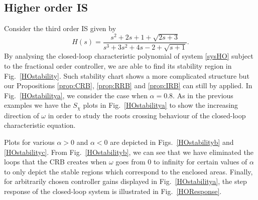 \documentclass[twoside,reqno,11pt]{fcaa-var} %
\begin{document}
\subsection{Higher order IS}
Consider the third order IS given by
\begin{equation}
H(s)=\frac{s^2+2s+1+\sqrt{2s+3}}{s^3+3s^2+4s-2+\sqrt{s+1}}. \label{sysHO}
\end{equation}
By analysing the closed-loop characteristic polynomial of system \eqref{sysHO} subject to the fractional order controller, we are able to find its stability region in Fig.~\ref{HOstability}. Such stability chart shows a more complicated structure but our Propositions \ref{prop:CRB}, \ref{prop:RRB} and \ref{prop:IRB} can still by applied. In Fig.~\ref{HOstabilitya}, we consider the case when $\alpha=0.8$. As in the previous examples we have the $S_\chi$ plots in Fig.~\ref{HOstabilitya} to show the increasing direction of $\omega$ in order to study the roots crossing behaviour of the closed-loop characteristic equation.\par 
Plots for various $\alpha>0$ and $\alpha<0$ are depicted in Figs.~\ref{HOstabilityb} and \ref{HOstabilityc}. From Fig.~\ref{HOstabilityb}, we can see that we have eliminated the loops that the CRB creates when $\omega$ goes from 0 to infinity for certain values of $\alpha$ to only depict the stable regions which correspond to the enclosed areas.
Finally, for arbitrarily chosen controller gains displayed in Fig.~\ref{HOstabilitya}, the step response of the closed-loop system is illustrated in Fig.~\ref{HOResponse}.
\end{document}
